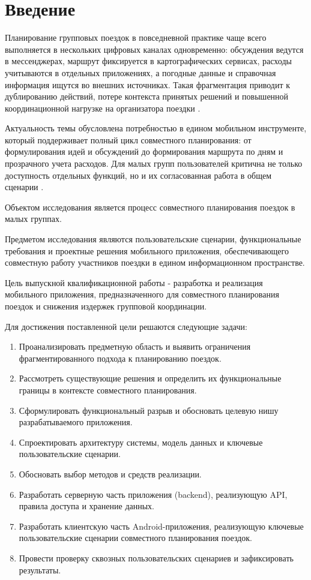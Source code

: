 \section{Введение}

Планирование групповых поездок в повседневной практике чаще всего выполняется в нескольких цифровых каналах одновременно: обсуждения ведутся в мессенджерах, маршрут фиксируется в картографических сервисах, расходы учитываются в отдельных приложениях, а погодные данные и справочная информация ищутся во внешних источниках. Такая фрагментация приводит к дублированию действий, потере контекста принятых решений и повышенной координационной нагрузке на организатора поездки .

Актуальность темы обусловлена потребностью в едином мобильном инструменте, который поддерживает полный цикл совместного планирования: от формулирования идей и обсуждений до формирования маршрута по дням и прозрачного учета расходов. Для малых групп пользователей критична не только доступность отдельных функций, но и их согласованная работа в общем сценарии .

Объектом исследования является процесс совместного планирования поездок в малых группах.

Предметом исследования являются пользовательские сценарии, функциональные требования и проектные решения мобильного приложения, обеспечивающего совместную работу участников поездки в едином информационном пространстве.

Цель выпускной квалификационной работы - разработка и реализация мобильного приложения, предназначенного для совместного планирования поездок и снижения издержек групповой координации.

Для достижения поставленной цели решаются следующие задачи:
\begin{enumerate}
    \item Проанализировать предметную область и выявить ограничения фрагментированного подхода к планированию поездок.
    \item Рассмотреть существующие решения и определить их функциональные границы в контексте совместного планирования.
    \item Сформулировать функциональный разрыв и обосновать целевую нишу разрабатываемого приложения.
    \item Спроектировать архитектуру системы, модель данных и ключевые пользовательские сценарии.
    \item Обосновать выбор методов и средств реализации.
    \item Разработать серверную часть приложения (backend), реализующую API, правила доступа и хранение данных.
    \item Разработать клиентскую часть Android-приложения, реализующую ключевые пользовательские сценарии совместного планирования поездок.
    \item Провести проверку сквозных пользовательских сценариев и зафиксировать результаты.
\end{enumerate}

